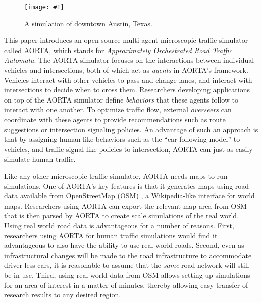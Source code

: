 \documentclass[letterpaper, 10 pt, conference]{ieeeconf}  %
\newcommand{\pix}[3]{
  \begin{figure}[h]
    \centering \texttt{[image: \#1]}
    \caption{#2}
  \end{figure}
}
\begin{document}


\pix{downtown_atx.png}{A simulation of downtown Austin, Texas.}{scale=0.25}

This paper introduces an open source multi-agent microscopic traffic
simulator called AORTA, which stands for \textit{Approximately
Orchestrated Road Traffic Automata}. The AORTA simulator focuses on
the interactions between individual vehicles and intersections, both
of which act as \textit{agents} in AORTA's framework. Vehicles
interact with other vehicles to pass and change lanes, and interact
with intersections to decide when to cross them. Researchers
developing applications on top of the AORTA simulator define
\textit{behaviors} that these agents follow to interact with one
another. To optimize traffic flow, external \textit{overseers} can
coordinate with these agents to provide recommendations such as route
suggestions or intersection signaling policies.  An advantage of such
an approach is that by assigning human-like behaviors such as the
``car following model'' \cite{brackstone1999car} to vehicles, and
traffic-signal-like policies to intersection, AORTA can just as easily
simulate human traffic.

Like any other microscopic traffic simulator, AORTA needs maps to run
simulations. One of AORTA's key features is that it generates maps using road data available from OpenStreetMap
(OSM) \cite{osm}, a Wikipedia-like interface for world maps. Researchers using
AORTA can export the relevant map area from OSM that is then parsed by AORTA to
create scale simulations of the real world. Using real world road data is
advantageous for a number of reasons. First, researchers using AORTA for human
traffic simulations would find it advantageous to also have the ability to use
real-world roads. Second, even as infrastructural changes will be made to the
road infrastructure to accommodate driver-less cars, it is reasonable to assume
that the \textit{same} road network will still be in use. Third, using
real-world data from OSM allows setting up simulations for an area of interest
in a matter of minutes, thereby allowing easy transfer of research results to
any desired region.

\end{document}
